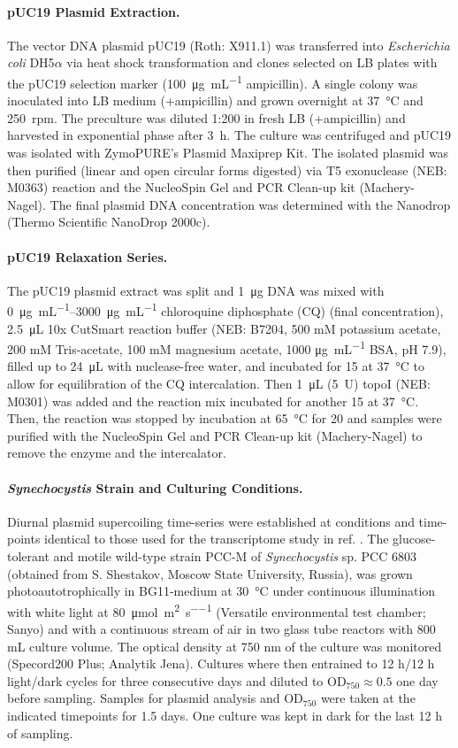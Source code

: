 \documentclass[10pt,a4]{article}
\def\cite#1{\hypersetup{citecolor=Teal}\citep{#1}} %
\newcommand{\photons}{\micro\mol\per\square\meter\per\second}
\newcommand{\ugml}{\micro\gram\per\milli\liter}
\newcommand{\scyst}{\textit{Synechocystis}}
\newcommand{\OD}{\ensuremath{\text{OD}_{750}}}
\begin{document}
\paragraph{pUC19 Plasmid Extraction.}
The vector DNA plasmid pUC19 (Roth: X911.1) was transferred into
\textit{Escherichia coli} DH5$\alpha$ via heat shock transformation
and clones selected on LB plates with the pUC19 selection marker
(\SI{100}{\ugml} ampicillin). A single colony was inoculated into LB
medium (+ampicillin) and grown overnight at \SI{37}{\celsius} and
\SI{250}{rpm}. The preculture was diluted 1:200 in fresh LB
(+ampicillin) and harvested in exponential phase after
\SI{3}{\hour}. The culture was centrifuged and pUC19 was isolated with
ZymoPURE's Plasmid Maxiprep Kit. The isolated plasmid was then
purified (linear and open circular forms digested) via T5 exonuclease
(NEB: M0363) reaction and the NucleoSpin Gel and PCR Clean-up kit
(Machery-Nagel). The final plasmid DNA concentration was determined
with the Nanodrop (Thermo Scientific NanoDrop 2000c).
%
\paragraph{pUC19 Relaxation Series.}
The pUC19 plasmid extract was split and \SI{1}{\ug} DNA was mixed with
\SIrange{0}{3000}{\ugml} chloroquine diphosphate (CQ) (final
concentration), \SI{2.5}{\uL} 10x CutSmart reaction buffer (NEB:
B7204, 500 mM potassium acetate, 200 mM Tris-acetate, 100 mM
magnesium acetate, 1000 \si{\ugml} BSA, pH 7.9), filled up to
\SI{24}{\uL} with nuclease-free water, and incubated for \SI{15}{\min}
at \SI{37}{\celsius} to allow for equilibration of the CQ
intercalation. Then \SI{1}{\uL} (\SI{5}{U}) topoI (NEB: M0301) was
added and the reaction mix incubated for another \SI{15}{\min} at
\SI{37}{\celsius}. Then, the reaction was stopped by incubation at
\SI{65}{\celsius} for \SI{20}{\min} and samples were purified with the
NucleoSpin Gel and PCR Clean-up kit (Machery-Nagel) to remove the
enzyme and the intercalator.

\paragraph{\scyst{} Strain and Culturing Conditions.}
Diurnal plasmid supercoiling time-series were established at
conditions and time-points identical to those used for the
transcriptome study in ref. \cite{Lehmann2013, Beck2014}.  The
glucose-tolerant and motile wild-type strain PCC-M of
\textit{Synechocystis} sp. PCC 6803 (obtained from S.  Shestakov,
Moscow State University, Russia), was grown photoautotrophically in
BG11-medium at \SI{30}{\celsius} under continuous illumination with
white light at \SI{80}{\photons} (Versatile environmental test
chamber; Sanyo) and with a continuous stream of air in two 
glass tube reactors with 800 mL culture volume.  The optical
density at 750 nm of the culture was monitored (Specord200 Plus;
Analytik Jena). Cultures where then entrained to 12 h/12 h light/dark
cycles for three consecutive days and diluted to $\OD{}\approx 0.5$
one day before sampling. Samples for plasmid analysis and \OD{} were
taken at the indicated timepoints for 1.5 days. One culture was
kept in dark for the last 12 h of sampling.
\end{document}
